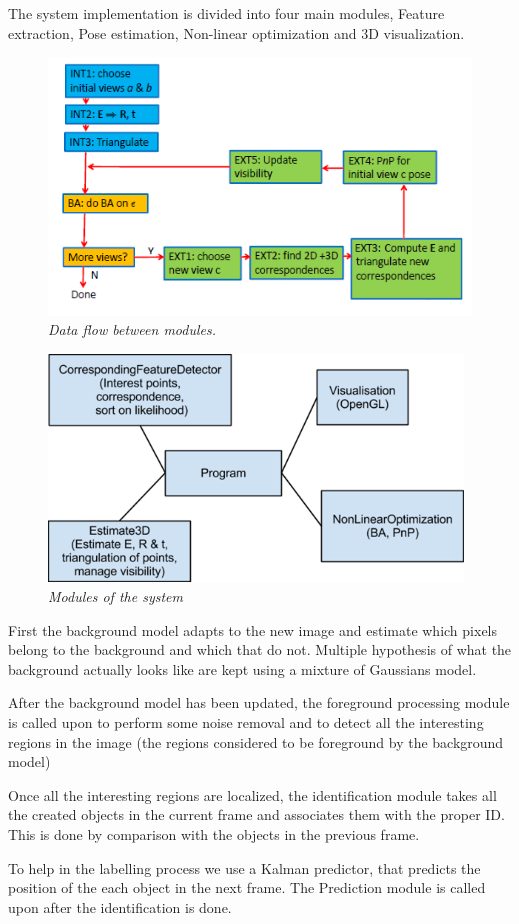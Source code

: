 The system implementation is divided into four main modules, Feature extraction, Pose estimation, Non-linear optimization and 3D visualization.


\begin{figure}[htb]
	\centering
	\includegraphics[width=\linewidth]{images/data_flow.png}
	\caption{\textit{Data flow between modules.}}
	\label{fig:block_overview_fig}  %
\end{figure}

\begin{figure}[htb]
	\centering
	\includegraphics[width=110mm]{images/system_modules.png}
	\caption{\textit{Modules of the system}}
	\label{fig:block_overview2_fig}  %
\end{figure}


First the background model adapts to the new image and estimate which pixels belong to the background and which that do not. Multiple hypothesis of what the background actually looks like are kept using a mixture of Gaussians model.

After the background model has been updated, the foreground processing module is called upon to perform some noise removal and to detect all the interesting regions in the image (the regions considered to be foreground by the background model)

Once all the interesting regions are localized, the identification module takes all the created objects in the current frame and associates them with the proper ID. This is done by comparison with the objects in the previous frame.

To help in the labelling process we use a Kalman predictor, that predicts the position of the each object in the next frame. The Prediction module is called upon after the identification is done.